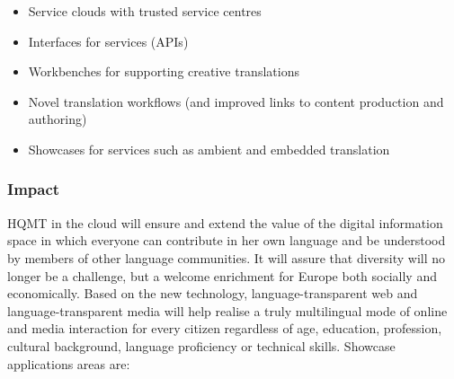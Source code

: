 \documentclass[10pt, plain]{../../metanetpaper}
\begin{document}
\begin{multicols}{2}
\begin{itemize}
\item Service clouds with trusted service centres
\item Interfaces for services (APIs)
\item Workbenches for supporting creative translations
\item Novel translation workflows (and improved links to content production and authoring)
\item Showcases for services such as ambient and embedded translation
\end{itemize}

\subsubsection{Impact}
\label{sec:impact-pt1}

%
%

HQMT in the cloud will ensure and extend the value of the digital information space in which everyone can contribute in her own language and be understood by members of other language communities. It will assure that diversity will no longer be a challenge, but a welcome enrichment for Europe both socially and economically. Based on the new technology, language-transparent web and language-transparent media will help realise a truly multilingual mode of online and media interaction for every citizen regardless of age, education, profession, cultural background, language proficiency or technical skills. Showcase applications areas are:


\end{multicols}
\end{document}
